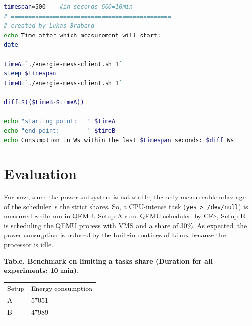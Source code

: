 \documentclass[]{report}
\begin{document}
\begin{lstlisting}[language=bash, style=code, caption=measure.sh]
timespan=600    #in seconds 600=10min
# ==============================================
# created by Lukas Braband
echo Time after which measurement will start:
date

timeA=`./energie-mess-client.sh 1`
sleep $timespan
timeB=`./energie-mess-client.sh 1`

diff=$(($timeB-$timeA))

echo "starting point:   " $timeA
echo "end point:        " $timeB
echo Consumption in Ws within the last $timespan seconds: $diff Ws
\end{lstlisting}

\section{Evaluation}\label{evaluation}

For now, since the power subsystem is not stable, the only measureable
adavtage of the scheduler is the strict shares. So, a CPU-intense task
(\lstinline!yes > /dev/null!) is measured while run in QEMU. Setup A
runs QEMU scheduled by CFS, Setup B is scheduling the QEMU process with
VMS and a share of 30\%. As expected, the power consu,ption is reduced
by the built-in routines of Linux because the processor is idle.

\textbf{Table. Benchmark on limiting a tasks share (Duration for all
experiments: 10 min).}

\begin{longtable}[c]{@{}ll@{}}
\toprule\addlinespace
\begin{minipage}[b]{0.12\columnwidth}\raggedright
Setup
\end{minipage} & \begin{minipage}[b]{0.24\columnwidth}\raggedright
Energy consumption
\end{minipage}
\\\addlinespace
\midrule\endhead
\begin{minipage}[t]{0.12\columnwidth}\raggedright
A
\end{minipage} & \begin{minipage}[t]{0.24\columnwidth}\raggedright
57051
\end{minipage}
\\\addlinespace
\begin{minipage}[t]{0.12\columnwidth}\raggedright
B
\end{minipage} & \begin{minipage}[t]{0.24\columnwidth}\raggedright
47989
\end{minipage}
\\\addlinespace
\bottomrule
\end{longtable}
\end{document}

